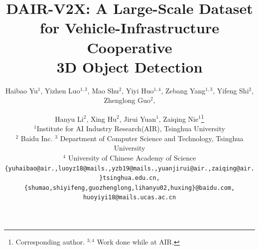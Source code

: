 \documentclass[10pt,twocolumn,letterpaper]{article}
\begin{document}
\title{DAIR-V2X: A Large-Scale Dataset for Vehicle-Infrastructure Cooperative \\ 3D Object Detection}
\author{Haibao Yu$^{1}$, Yizhen Luo$^{1,3}$, Mao Shu$^{2}$, Yiyi Huo$^{1,4}$, Zebang Yang$^{1,3}$, Yifeng Shi$^{2}$, Zhenglong Guo$^{2}$,
\and Hanyu Li$^{2}$, Xing Hu$^{2}$, Jirui Yuan$^{1}$, Zaiqing Nie$^{1}$\thanks{Corresponding author. $^{3,4}$ Work done while at AIR.} \\
$^{1}$Institute for AI Industry Research(AIR), Tsinghua University \\
$^{2}$ Baidu Inc. $^{3}$ Department of Computer Science and Technology, Tsinghua University\\$^{4}$ University of Chinese Academy of Science \\
{\tt\small \{yuhaibao@air.,luoyz18@mails.,yzb19@mails.,yuanjirui@air.,zaiqing@air.\}tsinghua.edu.cn,} \\ 
{\tt\small \{shumao,shiyifeng,guozhenglong,lihanyu02,huxing\}@baidu.com,  huoyiyi18@mails.ucas.ac.cn} 
}

\maketitle
\end{document}
